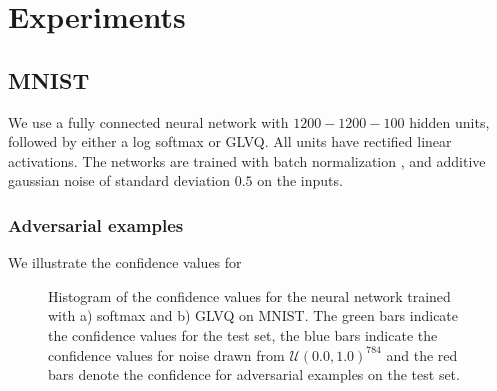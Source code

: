 \documentclass{esannV2}
\begin{document}
{{{{


\section{Experiments}
\subsection{MNIST}
We use a fully connected neural network with $1200-1200-100$ hidden units, followed by either a log softmax or GLVQ. All units have rectified linear activations. The networks are trained with batch normalization \cite{DBLP:journals/corr/IoffeS15}, and additive gaussian noise of standard deviation $0.5$ on the inputs. 

\subsubsection{Adversarial examples}
We illustrate the confidence values for 

\begin{figure}[ht]
\caption{Histogram of the confidence values for the neural network trained with a) softmax and b) GLVQ on MNIST. The green bars indicate the confidence values for the test set, the blue bars indicate the confidence values for noise drawn from $\mathcal{U}(0.0, 1.0)^{784}$ and the red bars denote the confidence for adversarial examples on the test set. }
\end{figure}

}}}}
\end{document}

